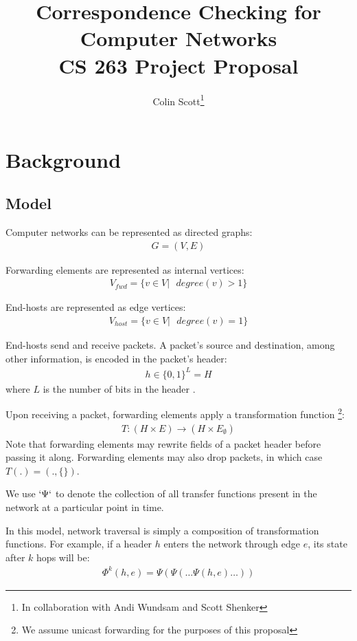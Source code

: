 \documentclass{sig-alternate-10pt}
\title{Correspondence Checking for Computer Networks \\
\Large{CS 263 Project Proposal \vspace{-25pt}}}
\author{Colin Scott\thanks{In collaboration with Andi
Wundsam and Scott Shenker}\vspace{-15pt}}
\date{}
\begin{document}
    \maketitle
    \thispagestyle{empty}
\section{Background}

\subsection{Model}

Computer networks can be represented as directed graphs:
\begin{align*}
G = (V, E)
\end{align*}

Forwarding elements are represented as internal vertices:
\begin{align*}
V_{fwd} = \{ v \in V |\text{ } degree(v) > 1 \}
\end{align*}

End-hosts are represented as edge vertices:
\begin{align*}
V_{host} = \{ v \in V |\text{ } degree(v) = 1 \}
\end{align*}

End-hosts send and receive packets. A packet's source and destination,
among other information, is encoded in the packet's header:
\begin{align*}
h \in \{0,1\}^L = H
\end{align*}
where $L$ is the number of bits in
the header \cite{HeaderSpace}.

Upon receiving a packet, forwarding elements apply a transformation function
\footnote{We assume unicast forwarding for the purposes of this proposal}:
\begin{align*}
T: (H \times E) \rightarrow (H \times E_{\emptyset})
\end{align*}
Note that forwarding elements may rewrite fields of a packet header before passing it along.
Forwarding elements may also drop packets, in which case $T(.) = (.,\{\})$.

We use $`\Psi`$ to denote the collection of all transfer functions present in
the network at a particular point in time.

In this model, network traversal is simply a composition of transformation
functions. For example, if a header $h$ enters the network through edge
$e$, its state after $k$ hops will be:
\begin{align*}
\Phi^k(h,e) = \Psi(\Psi(\dots \Psi(h,e)\dots))
\end{align*}
\end{document}
